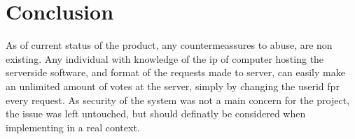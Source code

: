 \chapter{Conclusion}



As of current status of the product, any countermeassures to abuse, are non existing. Any individual with knowledge of the ip of computer hosting the serverside software, and format of the requests made to server, can easily make an unlimited amount of votes at the server, simply by changing the userid fpr every request. As security of the system was not a main concern for the project, the issue was left untouched, but should definatly be considered when implementing in a real context.    
